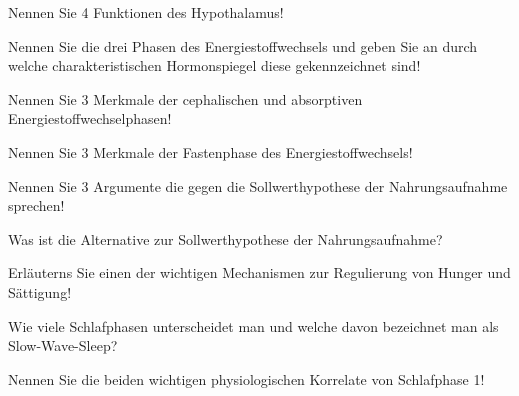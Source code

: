 \documentclass[10pt, a4paper]{exam}
\begin{document}
\begin{questions}
  \question Nennen Sie 4 Funktionen des Hypothalamus!
  \begin{solution}

  \end{solution}

  \question Nennen Sie die drei Phasen des Energiestoffwechsels und geben Sie an durch welche charakteristischen Hormonspiegel diese gekennzeichnet sind!
  \begin{solution}

  \end{solution}

  \question Nennen Sie 3 Merkmale der cephalischen und absorptiven Energiestoffwechselphasen!
  \begin{solution}

  \end{solution}

  \question Nennen Sie 3 Merkmale der Fastenphase des Energiestoffwechsels!
  \begin{solution}

  \end{solution}

  \question Nennen Sie 3 Argumente die gegen die Sollwerthypothese der Nahrungsaufnahme sprechen!
  \begin{solution}

  \end{solution}

  \question Was ist die Alternative zur Sollwerthypothese der Nahrungsaufnahme?
  \begin{solution}

  \end{solution}

  \question Erläuterns Sie einen der wichtigen Mechanismen zur Regulierung von Hunger und Sättigung!
  \begin{solution}

  \end{solution}

  \question Wie viele Schlafphasen unterscheidet man und welche davon bezeichnet man als Slow-Wave-Sleep?
  \begin{solution}

  \end{solution}

  \question Nennen Sie die beiden wichtigen physiologischen Korrelate von Schlafphase 1!
  \begin{solution}

  \end{solution}


\end{questions}
\end{document}
